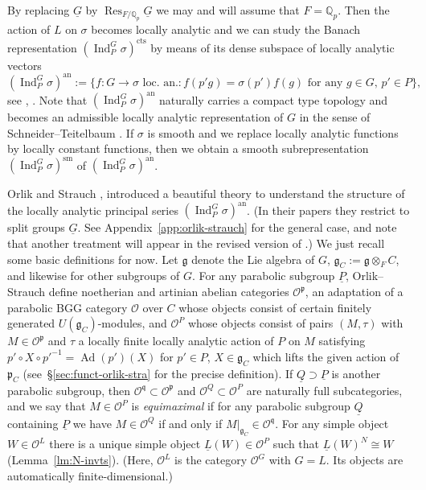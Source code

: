 \documentclass[a4paper]{amsart}
\numberwithin{equation}{section}
\theoremstyle{remark}
\theoremstyle{definition}
\DeclareMathOperator{\Ind}{Ind}
\DeclareMathOperator{\Ad}{Ad}
\DeclareMathOperator{\Res}{Res}
\newcommand{\Q}{\mathbb{Q}}
\newcommand{\sm}{\mathrm{sm}}
\newcommand{\alggrp}[1]{\underline{#1}}
\newcommand{\an}{\mathrm{an}}
\newcommand{\cts}{\mathrm{cts}}
\begin{document}
By replacing $\alggrp G$ by $\Res_{F/\Q_p} \alggrp G$ we may and will assume that $F = \Q_p$.
Then the action of $L$ on $\sigma$ becomes locally analytic and we can study the Banach representation $(\Ind_{P}^{G}\sigma)^{\cts}$ by means of its dense subspace of locally analytic vectors
\begin{equation*}
  (\Ind_P^G \sigma)^\an := \{ \text{$f\colon G\to \sigma$ loc.\ an.} : \text{$f(p'g) = \sigma(p')f(g)$ for any $g\in G$, $p'\in P$} \},
\end{equation*}
see \cite{MR1900706}, \cite{locallyanalytic-memoir}.
Note that $(\Ind_{P}^{G}\sigma)^{\an}$ naturally carries a compact type topology and becomes an admissible locally analytic representation of $G$ in the sense of Schneider--Teitelbaum \cite{ST}.
If $\sigma$ is smooth and we replace locally analytic functions by locally constant functions, then we obtain a smooth subrepresentation $(\Ind_P^G \sigma)^\sm$ of $(\Ind_P^G \sigma)^\an$.

Orlik and Strauch \cite{OS2}, \cite{OS3} introduced a beautiful theory to understand the structure of the locally analytic principal series $(\Ind_{P}^{G}\sigma)^{\an}$.
(In their papers they restrict to split groups $\alggrp G$. 
See Appendix~\ref{app:orlik-strauch} for the general case, and note that another treatment will appear in the revised version of \cite{OS3}.)
We just recall some basic definitions for now.
Let $\mathfrak g$ denote the Lie algebra of $G$, $\mathfrak g_C := \mathfrak g \otimes_F C$, and likewise for other subgroups of $G$.
For any parabolic subgroup $\alggrp P$, Orlik--Strauch define noetherian and artinian abelian categories $\mathcal O^{\mathfrak p}$, an adaptation of a parabolic BGG category $\mathcal O$ over $C$ whose objects consist of certain finitely generated $U(\mathfrak g_C)$-modules, and $\mathcal O^P$ whose objects consist of pairs $(M,\tau)$ with $M \in \mathcal O^{\mathfrak p}$ and $\tau$ a locally finite locally analytic action of $P$ on $M$ satisfying $p' \circ X \circ p'^{-1} = \Ad(p')(X)$ for $p' \in P$, $X \in \mathfrak g_C$ which lifts the given action of $\mathfrak p_C$ (see~\S\ref{sec:funct-orlik-stra} for the precise definition).
If $\alggrp Q \supset \alggrp P$ is another parabolic subgroup, then $\mathcal O^{\mathfrak q} \subset \mathcal O^{\mathfrak p}$ and $\mathcal O^Q \subset \mathcal O^P$ are naturally full subcategories, and we say that $M \in \mathcal O^P$ is \emph{equimaximal} if for any parabolic subgroup $\alggrp Q$ containing $\alggrp P$ we have $M \in \mathcal O^Q$ if and only if $M|_{\mathfrak g_C} \in \mathcal O^{\mathfrak q}$.
For any simple object $W \in \mathcal O^L$ there is a unique simple object $\underline L(W) \in \mathcal O^P$ such that $\underline L(W)^N \cong W$ (Lemma~\ref{lm:N-invts}).
(Here, $\mathcal O^L$ is the category $\mathcal O^G$ with $G = L$. Its objects are automatically finite-dimensional.)
\end{document}
